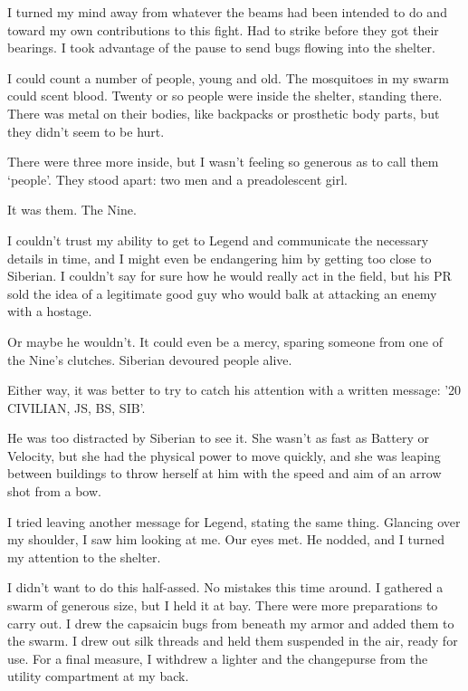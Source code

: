 I turned my mind away from whatever the beams had been intended to do and toward my own contributions to this fight.   Had to strike before they got their bearings.  I took advantage of the pause to send bugs flowing into the shelter.



I could count a number of people, young and old.  The mosquitoes in my swarm could scent blood.  Twenty or so people were inside the shelter, standing there.  There was metal on their bodies, like backpacks or prosthetic body parts, but they didn't seem to be hurt.



There were three more inside, but I wasn't feeling so generous as to call them `people'.  They stood apart: two men and a preadolescent girl.



It was them.  The Nine.



I couldn't trust my ability to get to Legend and communicate the necessary details in time, and I might even be endangering him by getting too close to Siberian.  I couldn't say for sure how he would really act in the field, but his PR sold the idea of a legitimate good guy who would balk at attacking an enemy with a hostage.



Or maybe he wouldn't.  It could even be a mercy, sparing someone from one of the Nine's clutches.  Siberian devoured people alive.



Either way, it was better to try to catch his attention with a written message: '20 CIVILIAN, JS, BS, SIB'.



He was too distracted by Siberian to see it.  She wasn't as fast as Battery or Velocity, but she had the physical power to move quickly, and she was leaping between buildings to throw herself at him with the speed and aim of an arrow shot from a bow.



I tried leaving another message for Legend, stating the same thing.  Glancing over my shoulder, I saw him looking at me.  Our eyes met.  He nodded, and I turned my attention to the shelter.



I didn't want to do this half-assed.  No mistakes this time around.  I gathered a swarm of generous size, but I held it at bay.  There were more preparations to carry out.  I drew the capsaicin bugs from beneath my armor and added them to the swarm.  I drew out silk threads and held them suspended in the air, ready for use.  For a final measure, I withdrew a lighter and the changepurse from the utility compartment at my back.



